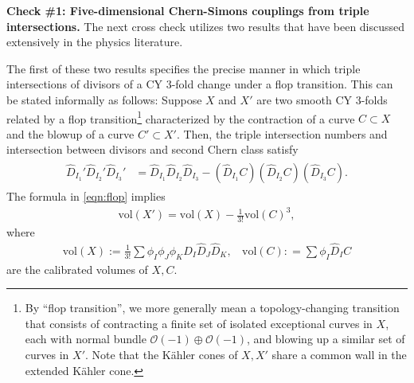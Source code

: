 \documentclass[11pt,oneside,english]{article}
\numberwithin{equation}{section}
\theoremstyle{definition}
\begin{document}
\noindent \textbf{Check \#1: Five-dimensional Chern-Simons couplings from triple intersections.} The next cross check utilizes two results that have been discussed extensively in the physics literature. 

The first of these two results specifies the precise manner in which triple intersections of divisors of a CY 3-fold change under a flop transition. This can be stated informally as follows: Suppose $X$ and $X'$ are two smooth CY 3-folds related by a flop transition\footnote{By ``flop transition'', we more generally mean a topology-changing transition that consists of contracting a finite set of isolated exceptional curves in $X$, each with normal bundle $\mathcal O(-1) \oplus \mathcal O(-1)$, and blowing up a similar set of curves in $X'$. Note that the Kähler cones of $X,X'$ share a common wall in the extended Kähler cone.} characterized by the contraction of a curve $C \subset X$ and the blowup of a curve $C' \subset X'$. Then, the triple intersection numbers and intersection between divisors and second Chern class satisfy \cite{wilson1999flops,mcduff1994j}
	\begin{align}
	\begin{split}
	\label{eqn:flop}
	 \hat D_{I_1}'  \hat D_{I_2}'  \hat D_{I_3}' &=	\hat D_{I_1}  \hat D_{I_2}  \hat D_{I_3}-  (\hat D_{I_1}  C )( \hat D_{I_2}  C )( \hat D_{I_3}  C).
	\end{split}
	\end{align}
The formula in \cref{eqn:flop} implies
	\begin{align}
	\label{eqn:prepflop}
		\text{vol}(X')=  \text{vol}(X)- \frac{1}{3!} \text{vol}(C)^3,
	\end{align}
where
\begin{align}
	\label{eqn:prepotential}
		\text{vol}(X) := \frac{1}{3!} \sum \phi_I \phi_J \phi_K \hat D_I  \hat D_J  \hat D_K,~~~~ \text{vol}(C): =\sum \phi_I \hat D_I  C
	\end{align}
are the calibrated volumes of $X,C$. 
\end{document}
